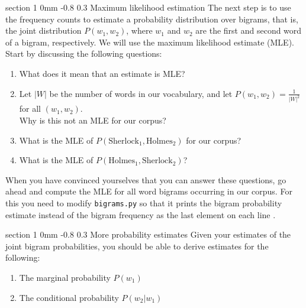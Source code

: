 \documentclass[11pt]{article}
\makeatletter
\newcommand{\newsec}[2]{\section{#1}\label{sec:#2}\noindent}
\renewcommand{\section}{\@startsection
{section}%
{1}%
{0mm}%
{-0.8\baselineskip}%
{0.3\baselineskip}%
{\bfseries\large}}%
\makeatother
\begin{document}
\newsec{Maximum likelihood estimation }{mle}%
The next step is to use the frequency counts to estimate a probability
distribution over bigrams, that is, the joint distribution $P(w_1,
w_2)$, where $w_1$ and $w_2$ are the first and second word of a
bigram, respectively.  We will use the maximum likelihood estimate
(MLE). Start by discussing the following questions:
\begin{enumerate}[itemsep=0pt]
\item  What does it mean that an estimate is MLE? %
\item  Let $|W|$ be the number of words in our vocabulary, and let $P(w_1, w_2) = \frac{1}{|W|^2}$ for all $(w_1, w_2)$.\\
  Why is this not an MLE for our
  corpus? %
\item  What is the MLE of $P(\mbox{Sherlock}_1, \mbox{Holmes}_2)$ for
  our corpus? %
\item  What is the MLE of $P(\mbox{Holmes}_1, \mbox{Sherlock}_2)$? %
\end{enumerate}
When you have convinced yourselves that you can answer these
questions, go ahead and compute the MLE for all word bigrams occurring
in our corpus. For this you need to modify {\tt bigrams.py} so that it
prints the bigram probability estimate instead of the bigram frequency
as the last element on each line .

\newsec{More probability estimates }{refine}%
Given your estimates of the joint bigram probabilities, you should be
able to derive estimates for the following:
\begin{enumerate}[itemsep=0pt]
\item  The marginal probability $P(w_1)$
\item  The conditional probability $P(w_2 | w_1)$
\end{enumerate}
\end{document}
